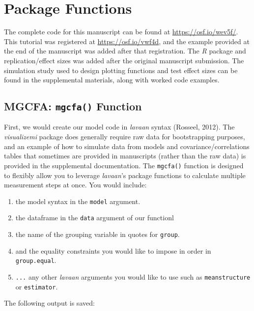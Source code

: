 \documentclass[
  man,floatsintext]{apa7}
\providecommand{\tightlist}{%
  \setlength{\itemsep}{0pt}\setlength{\parskip}{0pt}}
\begin{document}
\section{Package Functions}\label{package-functions}

The complete code for this manuscript can be found at \url{https://osf.io/wev5f/}. This tutorial was registered at \url{https://osf.io/vwf4d}, and the example provided at the end of the manuscript was added after that registration. The \emph{R} package and replication/effect sizes was added after the original manuscript submission. The simulation study used to design plotting functions and test effect sizes can be found in the supplemental materials, along with worked code examples.

\subsection{\texorpdfstring{MGCFA: \texttt{mgcfa()} Function}{MGCFA: mgcfa() Function}}\label{mgcfa-mgcfa-function}

First, we would create our model code in \emph{lavaan} syntax (Rosseel, 2012). The \emph{visualizemi} package does generally require raw data for bootstrapping purposes, and an example of how to simulate data from models and covariance/correlations tables that sometimes are provided in manuscripts (rather than the raw data) is provided in the supplemental documentation. The \texttt{mgcfa()} function is designed to flexibly allow you to leverage \emph{lavaan}'s package functions to calculate multiple measurement steps at once. You would include:

\begin{enumerate}
\def\labelenumi{\arabic{enumi})}
\tightlist
\item
  the model syntax in the \texttt{model} argument.
\item
  the dataframe in the \texttt{data} argument of our functionl
\item
  the name of the grouping variable in quotes for \texttt{group}.
\item
  and the equality constraints you would like to impose in order in \texttt{group.equal}.
\item
  \texttt{...} any other \emph{lavaan} arguments you would like to use such as \texttt{meanstructure} or \texttt{estimator}.
\end{enumerate}

The following output is saved:
\end{document}
